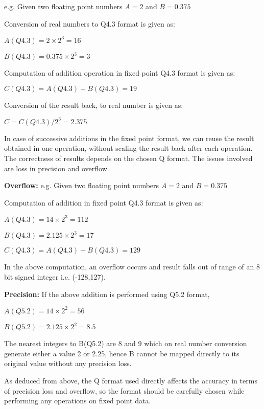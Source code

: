 \vspace{0.25cm}
\noindent e.g. Given two floating point numbers $A=2$ and $B=0.375$

\noindent Conversion of real numbers to Q4.3 format is given as:

\noindent $A(Q4.3)=2\times 2^{3} = 16$

\noindent $B(Q4.3)=0.375\times 2^{3}=3$

\noindent Computation of addition operation in fixed point Q4.3 format is given as:

\noindent $C(Q4.3)= A(Q4.3)+B(Q4.3)= 19$

\noindent Conversion of the result back, to real number is given as:

\noindent $C=C(Q4.3)/2^{3}=2.375$

\vspace{0.25cm}
\noindent In case of successive additions in the fixed point format, we can reuse the result obtained in one operation, without scaling the result back after each operation. The correctness of results depends on the chosen Q format. The issues involved are loss in precision and overflow.

\vspace{.25cm}
\noindent \textbf{Overflow:} e.g. Given two floating point numbers $A=2$ and $B=0.375$

\noindent Computation of addition in fixed point Q4.3 format is given as:

\noindent $A(Q4.3)=14\times 2^{3}= 112$

\noindent $B(Q4.3)= 2.125\times 2^{3}= 17$

\noindent $C(Q4.3)= A(Q4.3)+B(Q4.3)= 129$

\noindent In the above computation, an overflow occurs and result falls out of range of an 8 bit signed integer i.e. (-128,127).

\vspace{.25cm}
\noindent \textbf{Precision:} If the above addition is performed using Q5.2 format,

\noindent $A(Q5.2)=14\times 2^{2}= 56 $

\noindent $B(Q5.2)= 2.125\times 2^{2}= 8.5$

\noindent The nearest integers to B(Q5.2) are 8 and 9 which on real number conversion generate either a value 2 or 2.25, hence B cannot be mapped directly to its original value without any precision loss.

\vspace{.25cm}
\noindent As deduced from above, the Q format used directly affects the accuracy in terms of precision loss and overflow, so the format should be carefully chosen while performing any operations on fixed point data.

